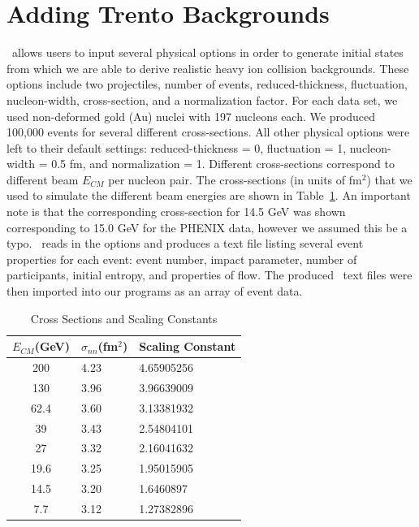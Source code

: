 \documentclass[11pt]{article}
\begin{document}
\section{Adding Trento Backgrounds}
%
%
\trento\ allows users to input several physical options in order to generate initial states from which we are able to derive realistic heavy ion collision backgrounds. These options include two projectiles, number of events, reduced-thickness, fluctuation, nucleon-width, cross-section, and a normalization factor. For each data set,  we used non-deformed gold (Au) nuclei with 197 nucleons each. We produced 100,000 events for several different cross-sections. All other physical options were left to their default settings: reduced-thickness = 0, fluctuation = 1, nucleon-width = 0.5 fm, and normalization = 1. Different cross-sections correspond to different beam $E_{CM}$ per nucleon pair. The cross-sections (in units of fm$^2$) that we used to simulate the different beam energies are shown in Table~\ref{tab_phenix_trento}.  An important note is that the corresponding cross-section for 14.5 GeV was shown corresponding to 15.0 GeV for the PHENIX data, however we assumed this be a typo. \trento\ reads in the options and produces a text file listing several event properties for each event: event number, impact parameter, number of participants, initial entropy, and properties of flow. The produced \trento\ text files were then imported into our programs as an array of event data.
%
\begin{table}[th]
\begin{center}
\caption{Cross Sections and Scaling Constants}
\label{tab_phenix_trento}
\begin{tabular}{|c|l|l|}
\hline
$E_{CM}$(GeV) & $\sigma_{nn}$(fm$^2$) & Scaling Constant \\
\hline
200 & 4.23 & 4.65905256 \\
\hline
130 & 3.96 & 3.96639009 \\
\hline
62.4 & 3.60 & 3.13381932 \\
\hline
39 & 3.43 & 2.54804101 \\
\hline
27 & 3.32 & 2.16041632 \\
\hline
19.6 & 3.25 & 1.95015905 \\
\hline
14.5 & 3.20 & 1.6460897 \\
\hline
7.7 & 3.12 & 1.27382896 \\
\hline
\end{tabular}
\end{center}
\end{table}
\end{document}

